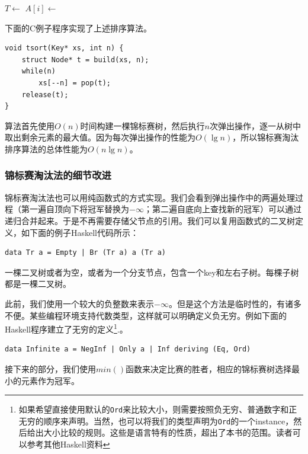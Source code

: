 \documentclass[b5paper]{ctexart}
\begin{document}
\begin{algorithmic}[1]
  \State $T \gets$ 
    \State $A[i] \gets$ 
  \EndFor
\EndProcedure
\end{algorithmic}

下面的C例子程序实现了上述排序算法。

\lstset{language=C}
\begin{lstlisting}
void tsort(Key* xs, int n) {
    struct Node* t = build(xs, n);
    while(n)
        xs[--n] = pop(t);
    release(t);
}
\end{lstlisting}

算法首先使用$O(n)$时间构建一棵锦标赛树，然后执行$n$次弹出操作，逐一从树中取出剩余元素的最大值。因为每次弹出操作的性能为$O(\lg n)$，所以锦标赛淘汰排序算法的总体性能为$O(n \lg n)$。

\subsubsection{锦标赛淘汰法的细节改进}

锦标赛淘汰法也可以用纯函数式的方式实现。我们会看到弹出操作中的两遍处理过程（第一遍自顶向下将冠军替换为$-\infty$；第二遍自底向上查找新的冠军）可以通过递归合并起来。于是不再需要存储父节点的引用。我们可以复用函数式的二叉树定义，如下面的例子Haskell代码所示：

\lstset{language=Haskell}
\begin{lstlisting}[style=Haskell]
data Tr a = Empty | Br (Tr a) a (Tr a)
\end{lstlisting}

一棵二叉树或者为空，或者为一个分支节点，包含一个key和左右子树。每棵子树都是一棵二叉树。

此前，我们使用一个较大的负整数来表示$-\infty$。但是这个方法是临时性的，有诸多不便。某些编程环境支持代数类型，这样就可以明确定义负无穷。例如下面的Haskell程序建立了无穷的定义\footnote{如果希望直接使用默认的\texttt{Ord}来比较大小，则需要按照负无穷、普通数字和正无穷的顺序来声明。当然，也可以将我们的类型声明为\texttt{Ord}的一个instance，然后给出大小比较的规则。这些是语言特有的性质，超出了本书的范围。读者可以参考其他Haskell资料}.。

\lstset{language=Haskell}
\begin{lstlisting}[style=Haskell]
data Infinite a = NegInf | Only a | Inf deriving (Eq, Ord)
\end{lstlisting}

接下来的部分，我们使用$min()$函数来决定比赛的胜者，相应的锦标赛树选择最小的元素作为冠军。
\end{document}
